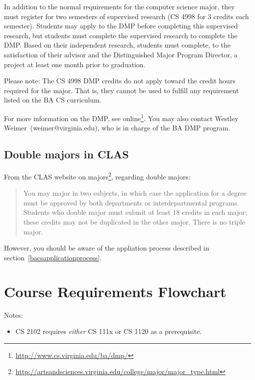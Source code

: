 \documentclass[10pt,letter]{book}
\makeatletter
\newenvironment{itemlist}{
\begin{itemize}
\setlength{\itemsep}{0pt}
\setlength{\parskip}{0pt}}
{\end{itemize}}
\newcommand{\badmp}{Westley Weimer}
\newcommand{\badmpemail}{weimer@virginia.edu}
\newcommand{\mysection}[1]{\section{#1}\renewcommand{\rightmark}{#1}}
\newcommand{\myurl}[1]{\footnote{\scriptsize\url{#1}}}
\makeatother
\begin{document}
In addition to the normal requirements for the computer science major,
they must register for two semesters of supervised research (CS 4998
for 3 credits each semester). Students may apply to the DMP before
completing this supervised research, but students must complete the
supervised research to complete the DMP. Based on their independent
research, students must complete, to the satisfaction of their advisor
and the Distinguished Major Program Director, a project at least one
month prior to graduation.

Please note: The CS 4998 DMP credits do not apply toward the credit
hours required for the major. That is, they cannot be used to fulfill
any requirement listed on the BA CS curriculum.

For more information on the DMP, see
online\myurl{http://www.cs.virginia.edu/ba/dmp/}. You may
also contact \badmp\ (\badmpemail), who is in charge of the BA DMP
program.

\subsection{Double majors in CLAS}

From the CLAS website on majors\myurl{http://artsandsciences.virginia.edu/college/major/major_type.html},
regarding double majors:

\begin{quotation}
\noindent You may major in two subjects, in which case the application
for a degree must be approved by both departments or inter\-departmental
programs. Students who double major must submit at least 18 credits in
each major; these credits may not be duplicated in the other
major. There is no triple major.
\end{quotation}

However, you should be aware of the appliation process described in
section~\ref{bacsapplicationprocess}.


\mysection{Course Requirements Flowchart}

\begin{figure}[h!]
\end{figure}

\noindent Notes:

\begin{itemlist}
\item CS 2102 requires {\em either} CS 111x or CS 1120 as a
  prerequisite.
\end{itemlist}
\end{document}
